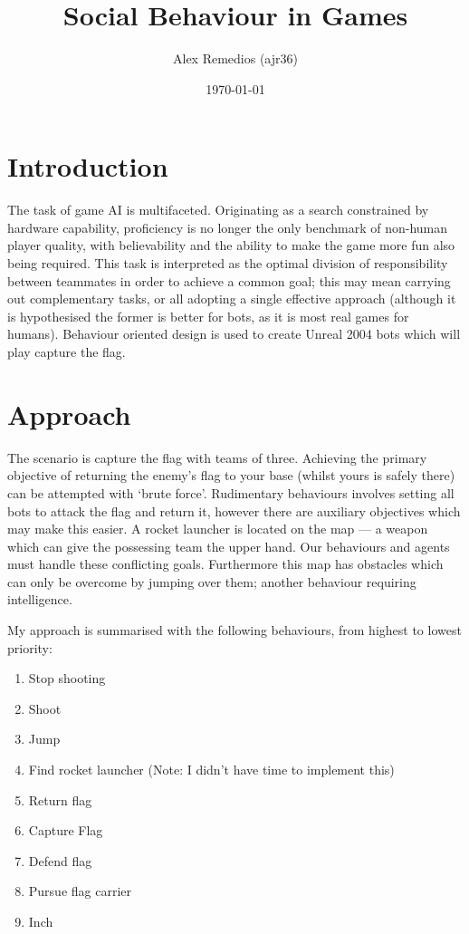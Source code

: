 \documentclass[a4paper,12pt]{article}
\title{Social Behaviour in Games}
\author{Alex Remedios (ajr36)}
\date{\today}
\begin{document}
\maketitle

\section{Introduction}
The task of game AI is multifaceted. Originating as a search constrained by hardware capability, proficiency is no longer the only benchmark of non-human player quality, with believability and the ability to make the game more fun also being required. This task is interpreted as the optimal division of responsibility between teammates in order to achieve a common goal; this may mean carrying out complementary tasks, or all adopting a single effective approach (although it is hypothesised the former is better for bots, as it is most real games for humans). Behaviour oriented design is used to create Unreal 2004 bots which will play capture the flag.

\section{Approach}
The scenario is capture the flag with teams of three. Achieving the primary objective of returning the enemy's flag to your base (whilst yours is safely there) can be attempted with `brute force'. Rudimentary behaviours involves setting all bots to attack the flag and return it, however there are auxiliary objectives which may make this easier. A rocket launcher is located on the map --- a weapon which can give the possessing team the upper hand. Our behaviours and agents must handle these conflicting goals. Furthermore this map has obstacles which can only be overcome by jumping over them; another behaviour requiring intelligence.

My approach is summarised with the following behaviours, from highest to lowest priority:
\begin{enumerate}
\item Stop shooting
\item Shoot
\item Jump
\item Find rocket launcher (Note: I didn't have time to implement this)
\item Return flag
\item Capture Flag
\item Defend flag
\item Pursue flag carrier
\item Inch
\end{enumerate}
\end{document}
